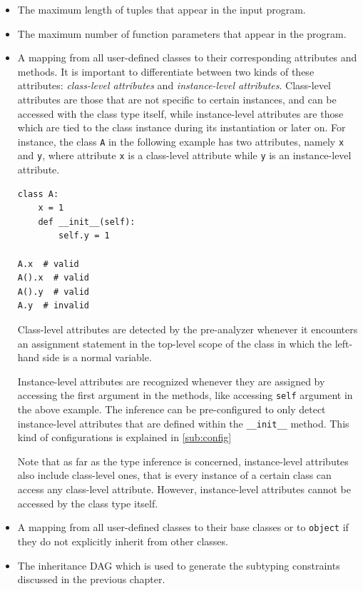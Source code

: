 \begin{itemize}
	\item The maximum length of tuples that appear in the input program.
	\item The maximum number of function parameters that appear in the program.
	\item A mapping from all user-defined classes to their corresponding attributes and methods. It is important to differentiate between two kinds of these attributes: \textit{class-level attributes} and \textit{instance-level attributes}. Class-level attributes are those that are not specific to certain instances, and can be accessed with the class type itself, while instance-level attributes are those which are tied to the class instance during its instantiation or later on. For instance, the class \lstinline|A| in the following example has two attributes, namely \lstinline|x| and \lstinline|y|, where attribute \lstinline|x| is a class-level attribute while \lstinline|y| is an instance-level attribute.
	
	\begin{lstlisting}
class A:
	x = 1
	def __init__(self):
		self.y = 1
		
A.x  # valid
A().x  # valid
A().y  # valid
A.y  # invalid
	\end{lstlisting}
	
	Class-level attributes are detected by the pre-analyzer whenever it encounters an assignment statement in the top-level scope of the class in which the left-hand side is a normal variable.
	
	Instance-level attributes are recognized whenever they are assigned by accessing the first argument in the methods, like accessing \lstinline|self| argument in the above example. The inference can be pre-configured to only detect instance-level attributes that are defined within the \lstinline|__init__| method. This kind of configurations is explained in \ref{sub:config}
	
	Note that as far as the type inference is concerned, instance-level attributes also include class-level ones, that is every instance of a certain class can access any class-level attribute. However, instance-level attributes cannot be accessed by the class type itself.
	
	\item A mapping from all user-defined classes to their base classes or to \lstinline|object| if they do not explicitly inherit from other classes.
	\item The inheritance DAG which is used to generate the subtyping constraints discussed in the previous chapter.
\end{itemize}

